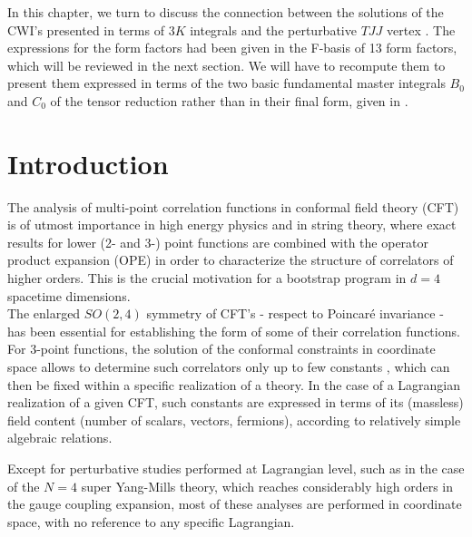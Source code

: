 \documentclass[a4paper,11pt,openright,twoside]{book}
\numberwithin{equation}{section}
\begin{document}
{{In this chapter, we turn to discuss the connection between the solutions of the CWI's presented in terms of $3K$ integrals and the perturbative $TJJ$ vertex \cite{Giannotti:2008cv,Armillis:2009pq}. The expressions for the form factors had been given in the F-basis of 13 form factors, which will be reviewed in the next section. We will have to recompute them to present them expressed in terms of the two basic fundamental master integrals $B_0$ and $C_0$ of the tensor reduction \cite{Coriano:2018bbe} rather than in their final form, given in \cite{Armillis:2009pq}.

\section{Introduction} 
The analysis of multi-point correlation functions in conformal field theory (CFT) is of utmost importance in high energy physics and in string theory, where exact results for lower (2- and 3-) point functions are combined with the operator product expansion (OPE) in order to characterize the structure of correlators of higher orders. This is the crucial motivation for a bootstrap program in $d=4$ spacetime dimensions. \\
The enlarged $SO(2,4)$ symmetry of CFT's - respect to Poincar\'{e} invariance - has been essential for establishing the form of some of their correlation functions. For 3-point functions, the solution of the conformal constraints in coordinate space allows to determine such correlators only up to few constants \cite{Osborn:1993cr, Erdmenger:1996yc}, which can then be fixed within a specific realization of a theory.  In the case of a Lagrangian realization of a given CFT, such constants are expressed in terms of its (massless) field content (number of scalars, vectors, fermions), according to relatively simple algebraic relations.  

Except for perturbative studies performed at Lagrangian level, such as in the case of the $N=4$ super Yang-Mills theory, which reaches considerably high orders in the gauge coupling expansion, most of these analyses are performed in coordinate space, with no reference to any specific Lagrangian. 

}}
\end{document}
